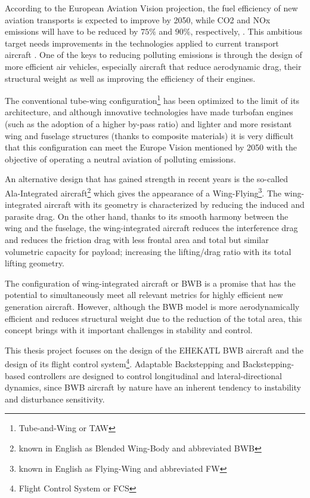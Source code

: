 According to the European Aviation Vision projection, the fuel efficiency of new aviation transports is expected to improve by 2050, while CO2 and NOx emissions will have to be reduced by $75 \%$ and $90 \%$, respectively, \cite{EU2011}. This ambitious target needs improvements in the technologies applied to current transport aircraft \cite{Chen2015}.
%
One of the keys to reducing polluting emissions is through the design of more efficient air vehicles, especially aircraft that reduce aerodynamic drag, their structural weight as well as improving the efficiency of their engines. 

The conventional tube-wing configuration\footnote{Tube-and-Wing or TAW} has been optimized to the limit of its architecture, and although innovative technologies have made turbofan engines (such as the adoption of a higher by-pass ratio) and lighter and more resistant wing and fuselage structures (thanks to composite materials) it is very difficult that this configuration can meet the Europe Vision mentioned by 2050 with the objective of operating a neutral aviation of polluting emissions.


An alternative design that has gained strength in recent years is the so-called Ala-Integrated aircraft\footnote{known in English as Blended Wing-Body and abbreviated BWB} which gives the appearance of a Wing-Flying\footnote{known in English as Flying-Wing and abbreviated FW}.
%
The wing-integrated aircraft with its geometry is characterized by reducing the induced and parasite drag. On the other hand, thanks to its smooth harmony between the wing and the fuselage, the wing-integrated aircraft reduces the interference drag and reduces the friction drag with less frontal area and total but similar volumetric capacity for payload; increasing the lifting/drag ratio with its total lifting geometry. 

The configuration of wing-integrated aircraft or BWB is a promise that has the potential to simultaneously meet all relevant metrics for highly efficient new generation aircraft. However, although the BWB model is more aerodynamically efficient and reduces structural weight due to the reduction of the total area, this concept brings with it important challenges in stability and control. 

This thesis project focuses on the design of the EHEKATL BWB aircraft and the design of its flight control system\footnote{Flight Control System or FCS}. Adaptable Backstepping and Backstepping-based controllers are designed to control longitudinal and lateral-directional dynamics, since BWB aircraft by nature have an inherent tendency to instability and disturbance sensitivity.

